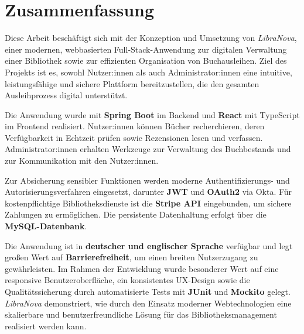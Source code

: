 \cleardoublepage

\chapter*{Zusammenfassung}
\sloppy
\justifying

Diese Arbeit beschäftigt sich mit der Konzeption und Umsetzung von \textit{LibraNova}, einer modernen, webbasierten Full-Stack-Anwendung zur digitalen Verwaltung einer Bibliothek sowie zur effizienten Organisation von Buchausleihen. Ziel des Projekts ist es, sowohl Nutzer:innen als auch Administrator:innen eine intuitive, leistungsfähige und sichere Plattform bereitzustellen, die den gesamten Ausleihprozess digital unterstützt.  

\noindent Die Anwendung wurde mit \textbf{Spring Boot} im Backend und \textbf{React} mit TypeScript im Frontend realisiert. Nutzer:innen können Bücher recherchieren, deren Verfügbarkeit in Echtzeit prüfen sowie Rezensionen lesen und verfassen. Administrator:innen erhalten Werkzeuge zur Verwaltung des Buchbestands und zur Kommunikation mit den Nutzer:innen.  

\noindent Zur Absicherung sensibler Funktionen werden moderne Authentifizierungs- und Autorisierungsverfahren eingesetzt, darunter \textbf{JWT} und \textbf{OAuth2} via Okta. Für kostenpflichtige Bibliotheksdienste ist die \textbf{Stripe API} eingebunden, um sichere Zahlungen zu ermöglichen. Die persistente Datenhaltung erfolgt über die \textbf{MySQL-Datenbank}. 

\noindent Die Anwendung ist in \textbf{deutscher und englischer Sprache} verfügbar und legt großen Wert auf \textbf{Barrierefreiheit}, um einen breiten Nutzerzugang zu gewährleisten. Im Rahmen der Entwicklung wurde besonderer Wert auf eine responsive Benutzeroberfläche, ein konsistentes UX-Design sowie die Qualitätssicherung durch automatisierte Tests mit \textbf{JUnit} und \textbf{Mockito} gelegt. \textit{LibraNova} demonstriert, wie durch den Einsatz moderner Webtechnologien eine skalierbare und benutzerfreundliche Lösung für das Bibliotheksmanagement realisiert werden kann.